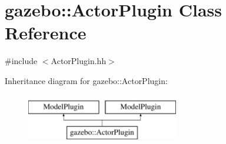 \hypertarget{classgazebo_1_1ActorPlugin}{}\section{gazebo\+::Actor\+Plugin Class Reference}
\label{classgazebo_1_1ActorPlugin}


{\ttfamily \#include $<$Actor\+Plugin.\+hh$>$}

Inheritance diagram for gazebo\+::Actor\+Plugin\+:\begin{figure}[H]
\begin{center}
\leavevmode
\includegraphics[height=2.000000cm]{classgazebo_1_1ActorPlugin}
\end{center}
\end{figure}

